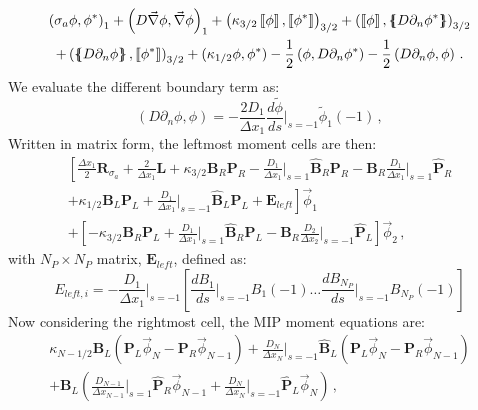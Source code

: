 \documentclass[11pt]{article}
\newcommand{\benum}{\begin{equation}}
\newcommand{\eenum}{\end{equation}}
\newcommand{\del}{\ensuremath{ \vec{\nabla} }}
\newcommand{\p}{\ensuremath{ d}}
\newcommand{\jmp}[1]{\ensuremath{\left\llbracket #1 \right\rrbracket}}
\newcommand{\avg}[1]{\ensuremath{ \left \{ \hspace{-0.055in} \left \{ #1  \right \}\hspace{-0.055in} \right \} }}
\newcommand{\pec}{\, ,}
\newcommand{\pep}{\, .}
\begin{document}
\begin{multline*}
\left( \sigma_a\phi,\phi^* \right)_1 + \left( D\del\phi,\del\phi \right)_1
  +\left( \kappa_{3/2} \jmp{\phi},\jmp{\phi^*}\right)_{3/2} 
 +\left(  \jmp{\phi}, \avg{ D\partial_n \phi^*}\right)_{3/2} \\
 +\left( \avg{D\partial_n\phi}, \jmp{\phi^*} \right)_{3/2} 
 + (\kappa_{1/2} \phi, \phi^*) - \frac{1}{2}\left( \phi,D\partial_n \phi^*  \right) - \frac{1}{2}\left( D\partial_n \phi, \phi \right) \pep
\end{multline*}
%
We evaluate the different boundary term as:
\benum
(D\partial_n \phi,\phi) = -\frac{2 D_1}{\Delta x_1}\frac{d \widetilde{\phi} }{\p s} \bigg \lvert_{s=-1}  \widetilde{\phi}_1(-1) \pec
\eenum
%
Written in matrix form, the leftmost moment cells are then:
\begin{multline}
\left[ \frac{\Delta x_1}{2}\mathbf{R}_{\sigma_a} + \frac{2}{\Delta x_1}\mathbf{L} + \kappa_{3/2} \mathbf{ B}_R \mathbf{P}_R - \frac{D_1}{\Delta x_1} \bigg \lvert_{s=1} \widehat{\mathbf B}_R  \mathbf{P}_R
-\mathbf{B}_R \frac{D_1}{\Delta x_1}\bigg \lvert_{s=1} \widehat{\mathbf P}_R \right. \\
 \left. + \kappa_{1/2} \mathbf{B}_L \mathbf{P}_L + \frac{D_1}{\Delta x_1} \bigg \lvert_{s=-1} \widehat{\mathbf B}_L \mathbf{P}_L + \mathbf{E}_{left} \right]\vec{\phi}_1 \\
%
+ \left[ -\kappa_{3/2} \mathbf{ B}_R \mathbf{P}_L + \frac{D_1}{\Delta x_1} \bigg \lvert_{s=1} \widehat{\mathbf B}_R \mathbf{P}_L  
-\mathbf{B}_R \frac{D_2}{\Delta x_2} \bigg \lvert_{s=-1} \widehat{\mathbf P}_L \right] \vec{\phi}_2 \pec
\end{multline}
with $N_P \times N_P$ matrix, $\mathbf{E}_{left}$, defined as:
\benum
E_{left,i} = -\frac{D_1}{\Delta x_1} \bigg \lvert_{s=-1} \left[ \frac{d B_1}{d s}\bigg \lvert_{s=-1} B_1(-1) \dots \frac{d B_{N_P}}{d s}\bigg \lvert_{s=-1} B_{N_P}(-1) \right] 
\eenum
%
%
%
Now considering the rightmost cell, the MIP moment equations are:
\begin{multline}
\kappa_{N-1/2} \mathbf{B}_L \left(\mathbf{P}_L \vec{\phi}_N - \mathbf{P}_R \vec{\phi}_{N-1}  \right)
+   \frac{D_N}{\Delta x_N} \bigg \lvert_{s=-1} \widehat{\mathbf B}_L \left( \mathbf{P}_L\vec{\phi}_N - \mathbf{P}_R \vec{\phi}_{N-1} \right) \\
+ \mathbf{B}_L \left( \frac{D_{N-1}}{\Delta x_{N-1}} \bigg \lvert_{s=1} \widehat{\mathbf P}_R \vec{\phi}_{N-1} + \frac{D_N}{\Delta x_N} \bigg \lvert_{s=-1}  \widehat{\mathbf P}_L \vec{\phi}_N  \right) \pec
\end{multline}
\end{document}
